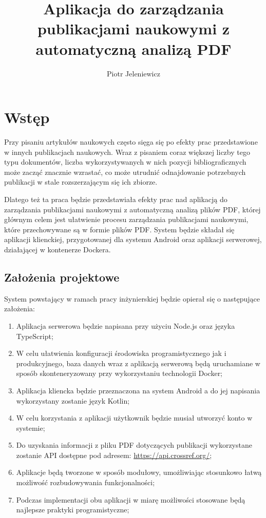 \documentclass[a4paper,12pt,twoside,openany]{report}
\title{Aplikacja do zarządzania publikacjami naukowymi z automatyczną analizą PDF}
\author{Piotr Jeleniewicz}
\begin{document}
\maketitle

\chapter{Wstęp}
Przy pisaniu artykułów naukowych często sięga się po efekty prac przedstawione w innych publikacjach naukowych. Wraz z pisaniem coraz większej liczby tego typu dokumentów, liczba wykorzystywanych w nich pozycji bibliograficznych może zacząć znacznie wzrastać, co może utrudnić odnajdowanie potrzebnych publikacji w stale rozszerzającym się ich zbiorze. 

Dlatego też ta praca będzie przedstawiała efekty prac nad aplikacją do zarządzania publikacjami naukowymi z automatyczną analizą plików PDF, której głównym celem jest ułatwienie procesu zarządzania publikacjami naukowymi, które przechowywane są w formie plików PDF. System będzie składał się aplikacji klienckiej, przygotowanej dla systemu Android oraz aplikacji serwerowej, działającej w kontenerze Dockera.
\section{Założenia projektowe}

\hspace{10pt} 	System powstający w ramach pracy inżynierskiej będzie opierał się o następujące założenia: 	
\begin{enumerate}
	\item Aplikacja serwerowa będzie napisana przy użyciu Node.js oraz języka TypeScript;
	\item W celu ułatwienia konfiguracji środowiska programistycznego jak i produkcyjnego, baza danych wraz z aplikacją serwerową będą uruchamiane w sposób skonteneryzowany przy wykorzystaniu technologii Docker;
	\item Aplikacja kliencka będzie przeznaczona na system Android a do jej napisania wykorzystany zostanie język Kotlin;
	\item W celu korzystania z aplikacji użytkownik będzie musiał utworzyć konto w systemie;
	\item Do uzyskania informacji z pliku PDF dotyczących publikacji wykorzystane zostanie API dostępne pod adresem: \newline \url{https://api.crossref.org/};
	\item Aplikacje będą tworzone w sposób modułowy, umożliwiając stosunkowo łatwą możliwość rozbudowywania funkcjonalności;
	\item Podczas implementacji obu aplikacji w miarę możliwości stosowane będą najlepsze praktyki programistyczne;
\end{enumerate}
\end{document}
